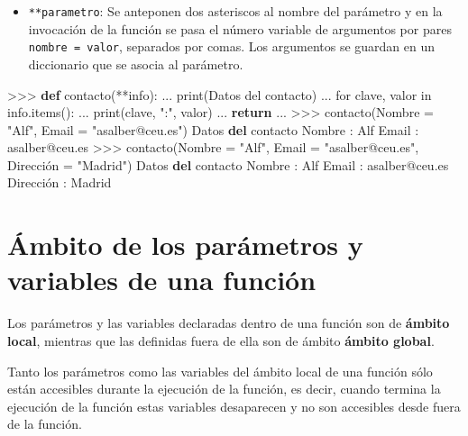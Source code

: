 \documentclass[
  spanish,
  a4paper,
]{scrreport}
\newenvironment{Shaded}{\begin{snugshade}}{\end{snugshade}}
\newcommand{\BuiltInTok}[1]{\textcolor[rgb]{0.00,0.23,0.31}{#1}}
\newcommand{\ControlFlowTok}[1]{\textcolor[rgb]{0.00,0.23,0.31}{\textbf{#1}}}
\newcommand{\ErrorTok}[1]{\textcolor[rgb]{0.68,0.00,0.00}{#1}}
\newcommand{\KeywordTok}[1]{\textcolor[rgb]{0.00,0.23,0.31}{\textbf{#1}}}
\newcommand{\NormalTok}[1]{\textcolor[rgb]{0.00,0.23,0.31}{#1}}
\newcommand{\OperatorTok}[1]{\textcolor[rgb]{0.37,0.37,0.37}{#1}}
\newcommand{\StringTok}[1]{\textcolor[rgb]{0.13,0.47,0.30}{#1}}
\providecommand{\tightlist}{%
  \setlength{\itemsep}{0pt}\setlength{\parskip}{0pt}}
\begin{document}
\begin{itemize}
\tightlist
\item
  \texttt{**parametro}: Se anteponen dos asteriscos al nombre del
  parámetro y en la invocación de la función se pasa el número variable
  de argumentos por pares \texttt{nombre\ =\ valor}, separados por
  comas. Los argumentos se guardan en un diccionario que se asocia al
  parámetro.
\end{itemize}

\begin{Shaded}
\begin{Highlighting}[]
\OperatorTok{\textgreater{}\textgreater{}\textgreater{}} \KeywordTok{def}\NormalTok{ contacto(}\OperatorTok{**}\NormalTok{info):}
\NormalTok{...     }\BuiltInTok{print}\NormalTok{(}\StringTok{\textquotesingle{}Datos del contacto)}
\ErrorTok{...     for clave, valor in info.items}\NormalTok{():}
\NormalTok{...         }\BuiltInTok{print}\NormalTok{(clave, }\StringTok{":"}\NormalTok{, valor)}
\NormalTok{...     }\ControlFlowTok{return}
\NormalTok{...}
\OperatorTok{\textgreater{}\textgreater{}\textgreater{}}\NormalTok{ contacto(Nombre }\OperatorTok{=} \StringTok{"Alf"}\NormalTok{, Email }\OperatorTok{=} \StringTok{"asalber@ceu.es"}\NormalTok{)}
\NormalTok{Datos }\KeywordTok{del}\NormalTok{ contacto}
\NormalTok{Nombre : Alf}
\NormalTok{Email : asalber}\OperatorTok{@}\NormalTok{ceu.es}
\OperatorTok{\textgreater{}\textgreater{}\textgreater{}}\NormalTok{ contacto(Nombre }\OperatorTok{=} \StringTok{"Alf"}\NormalTok{, Email }\OperatorTok{=} \StringTok{"asalber@ceu.es"}\NormalTok{, Dirección }\OperatorTok{=} \StringTok{"Madrid"}\NormalTok{)}
\NormalTok{Datos }\KeywordTok{del}\NormalTok{ contacto}
\NormalTok{Nombre : Alf}
\NormalTok{Email : asalber}\OperatorTok{@}\NormalTok{ceu.es}
\NormalTok{Dirección : Madrid}
\end{Highlighting}
\end{Shaded}

\section{Ámbito de los parámetros y variables de una
función}\label{uxe1mbito-de-los-paruxe1metros-y-variables-de-una-funciuxf3n}

Los parámetros y las variables declaradas dentro de una función son de
\textbf{ámbito local}, mientras que las definidas fuera de ella son de
ámbito \textbf{ámbito global}.

Tanto los parámetros como las variables del ámbito local de una función
sólo están accesibles durante la ejecución de la función, es decir,
cuando termina la ejecución de la función estas variables desaparecen y
no son accesibles desde fuera de la función.
\end{document}
